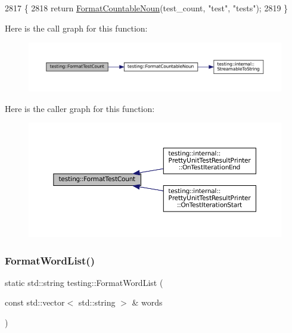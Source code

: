 \begin{DoxyCode}
2817                                                  \{
2818   \textcolor{keywordflow}{return} \hyperlink{namespacetesting_a33e070c3e994cb75f9017fa2a044d536}{FormatCountableNoun}(test\_count, \textcolor{stringliteral}{"test"}, \textcolor{stringliteral}{"tests"});
2819 \}
\end{DoxyCode}
Here is the call graph for this function\+:
\nopagebreak
\begin{figure}[H]
\begin{center}
\leavevmode
\includegraphics[width=350pt]{namespacetesting_a7420a0eb48a02ba210e265afb75febdf_cgraph}
\end{center}
\end{figure}
Here is the caller graph for this function\+:
\nopagebreak
\begin{figure}[H]
\begin{center}
\leavevmode
\includegraphics[width=350pt]{namespacetesting_a7420a0eb48a02ba210e265afb75febdf_icgraph}
\end{center}
\end{figure}
\mbox{\label{namespacetesting_a4354761948a5cf56fdf905418a0f78f1}} 
\subsubsection{\texorpdfstring{Format\+Word\+List()}{FormatWordList()}}
{\footnotesize\ttfamily static std\+::string testing\+::\+Format\+Word\+List (\begin{DoxyParamCaption}\item[{const std\+::vector$<$ std\+::string $>$ \&}]{words }\end{DoxyParamCaption})\hspace{0.3cm}{\ttfamily [static]}}



